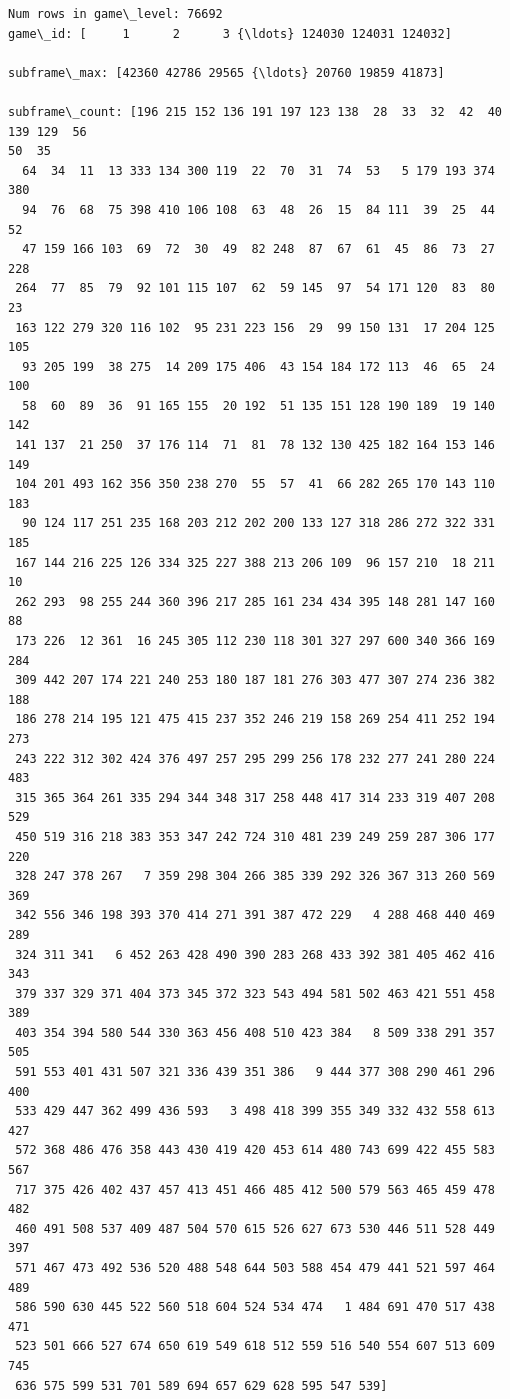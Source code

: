 \documentclass[11pt]{article}
\begin{document}
    \begin{Verbatim}[commandchars=\\\{\}]
Num rows in game\_level: 76692
game\_id: [     1      2      3 {\ldots} 124030 124031 124032]

subframe\_max: [42360 42786 29565 {\ldots} 20760 19859 41873]

subframe\_count: [196 215 152 136 191 197 123 138  28  33  32  42  40 139 129  56
50  35
  64  34  11  13 333 134 300 119  22  70  31  74  53   5 179 193 374 380
  94  76  68  75 398 410 106 108  63  48  26  15  84 111  39  25  44  52
  47 159 166 103  69  72  30  49  82 248  87  67  61  45  86  73  27 228
 264  77  85  79  92 101 115 107  62  59 145  97  54 171 120  83  80  23
 163 122 279 320 116 102  95 231 223 156  29  99 150 131  17 204 125 105
  93 205 199  38 275  14 209 175 406  43 154 184 172 113  46  65  24 100
  58  60  89  36  91 165 155  20 192  51 135 151 128 190 189  19 140 142
 141 137  21 250  37 176 114  71  81  78 132 130 425 182 164 153 146 149
 104 201 493 162 356 350 238 270  55  57  41  66 282 265 170 143 110 183
  90 124 117 251 235 168 203 212 202 200 133 127 318 286 272 322 331 185
 167 144 216 225 126 334 325 227 388 213 206 109  96 157 210  18 211  10
 262 293  98 255 244 360 396 217 285 161 234 434 395 148 281 147 160  88
 173 226  12 361  16 245 305 112 230 118 301 327 297 600 340 366 169 284
 309 442 207 174 221 240 253 180 187 181 276 303 477 307 274 236 382 188
 186 278 214 195 121 475 415 237 352 246 219 158 269 254 411 252 194 273
 243 222 312 302 424 376 497 257 295 299 256 178 232 277 241 280 224 483
 315 365 364 261 335 294 344 348 317 258 448 417 314 233 319 407 208 529
 450 519 316 218 383 353 347 242 724 310 481 239 249 259 287 306 177 220
 328 247 378 267   7 359 298 304 266 385 339 292 326 367 313 260 569 369
 342 556 346 198 393 370 414 271 391 387 472 229   4 288 468 440 469 289
 324 311 341   6 452 263 428 490 390 283 268 433 392 381 405 462 416 343
 379 337 329 371 404 373 345 372 323 543 494 581 502 463 421 551 458 389
 403 354 394 580 544 330 363 456 408 510 423 384   8 509 338 291 357 505
 591 553 401 431 507 321 336 439 351 386   9 444 377 308 290 461 296 400
 533 429 447 362 499 436 593   3 498 418 399 355 349 332 432 558 613 427
 572 368 486 476 358 443 430 419 420 453 614 480 743 699 422 455 583 567
 717 375 426 402 437 457 413 451 466 485 412 500 579 563 465 459 478 482
 460 491 508 537 409 487 504 570 615 526 627 673 530 446 511 528 449 397
 571 467 473 492 536 520 488 548 644 503 588 454 479 441 521 597 464 489
 586 590 630 445 522 560 518 604 524 534 474   1 484 691 470 517 438 471
 523 501 666 527 674 650 619 549 618 512 559 516 540 554 607 513 609 745
 636 575 599 531 701 589 694 657 629 628 595 547 539]


\end{Verbatim}
\end{document}
